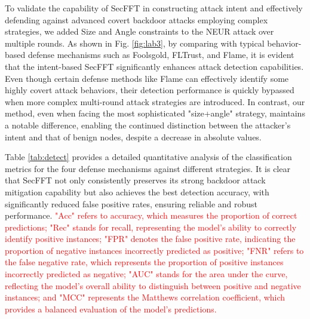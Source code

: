 \documentclass[lettersize,journal]{IEEEtran}
\begin{document}
To validate the capability of SecFFT in constructing attack intent and effectively defending against advanced covert backdoor attacks employing complex strategies, we added Size and Angle constraints to the NEUR attack over multiple rounds. As shown in Fig. \ref{fig:lab3}, by comparing with typical behavior-based defense mechanisms such as Foolsgold, FLTrust, and Flame, it is evident that the intent-based SecFFT significantly enhances attack detection capabilities. Even though certain defense methods like Flame can effectively identify some highly covert attack behaviors, their detection performance is quickly bypassed when more complex multi-round attack strategies are introduced. In contrast, our method, even when facing the most sophisticated "size+angle" strategy, maintains a notable difference, enabling the continued distinction between the attacker's intent and that of benign nodes, despite a decrease in absolute values.

Table \ref{tab:detect} provides a detailed quantitative analysis of the classification metrics for the four defense mechanisms against different strategies. It is clear that SecFFT not only consistently preserves its strong backdoor attack mitigation capability but also achieves the best detection accuracy, with significantly reduced false positive rates, ensuring reliable and robust performance.\textcolor{red}{ "Acc" refers to accuracy, which measures the proportion of correct predictions; "Rec" stands for recall, representing the model's ability to correctly identify positive instances; "FPR" denotes the false positive rate, indicating the proportion of negative instances incorrectly predicted as positive; "FNR" refers to the false negative rate, which represents the proportion of positive instances incorrectly predicted as negative; "AUC" stands for the area under the curve, reflecting the model's overall ability to distinguish between positive and negative instances; and "MCC" represents the Matthews correlation coefficient, which provides a balanced evaluation of the model's predictions.}
\end{document}
